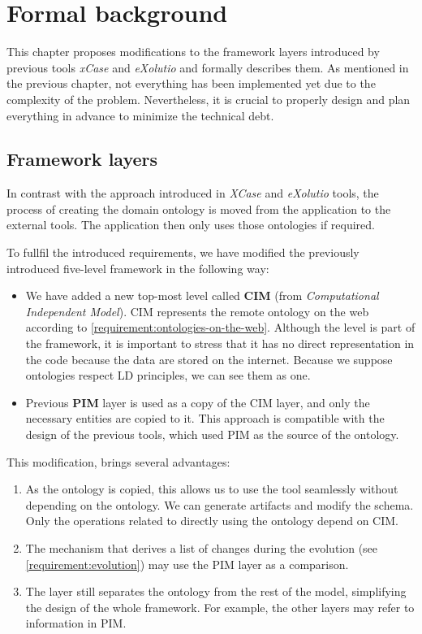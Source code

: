 \chapter{Formal background}
\label{chapters:formal-background}

This chapter proposes modifications to the framework layers introduced by previous tools \textit{xCase} and \textit{eXolutio} and formally describes them. As mentioned in the previous chapter, not everything has been implemented yet due to the complexity of the problem. Nevertheless, it is crucial to properly design and plan everything in advance to minimize the technical debt.

\section{Framework layers}

In contrast with the approach introduced in \textit{XCase} and \textit{eXolutio} tools, the process of creating the domain ontology is moved from the application to the external tools. The application then only uses those ontologies if required.

To fullfil the introduced requirements, we have modified the previously introduced five-level framework in the following way:
\begin{itemize}
    \item We have added a new top-most level called \textbf{CIM} (from \textit{Computational Independent Model}). CIM represents the remote ontology on the web according to \autoref{requirement:ontologies-on-the-web}. Although the level is part of the framework, it is important to stress that it has no direct representation in the code because the data are stored on the internet. Because we suppose ontologies respect LD principles, we can see them as one.
    \item Previous \textbf{PIM} layer is used as a copy of the CIM layer, and only the necessary entities are copied to it. This approach is compatible with the design of the previous tools, which used PIM as the source of the ontology.
\end{itemize}

This modification, brings several advantages:
\begin{enumerate}
    \item As the ontology is copied, this allows us to use the tool seamlessly without depending on the ontology. We can generate artifacts and modify the schema. Only the operations related to directly using the ontology depend on CIM.
    \item The mechanism that derives a list of changes during the evolution (see \autoref{requirement:evolution}) may use the PIM layer as a comparison.
    \item The layer still separates the ontology from the rest of the model, simplifying the design of the whole framework. For example, the other layers may refer to information in PIM.
\end{enumerate}

